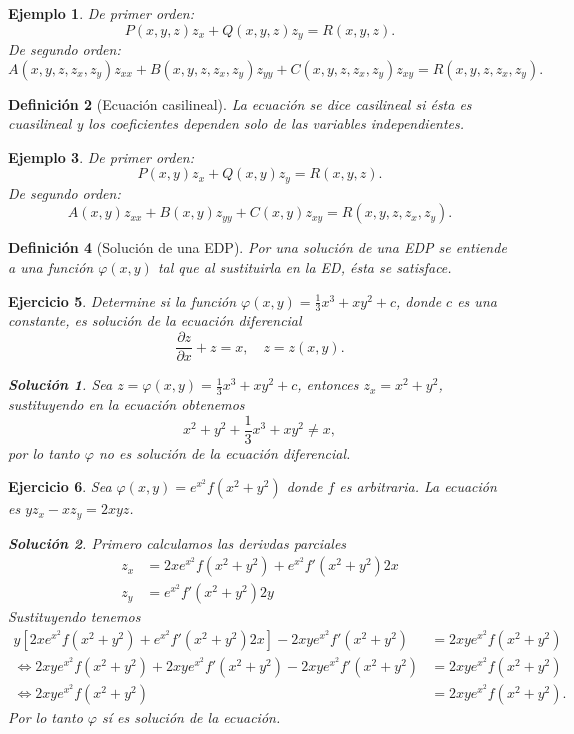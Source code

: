 \documentclass[11pt,letterpaper]{report}
\newtheorem{defn}{Definición}[chapter]
\newtheorem{example}[defn]{Ejemplo}
\newtheorem{exe}[defn]{Ejercicio}
\newtheorem*{sol}{Solución}
\newcommand\<{\langle}
\renewcommand\>{\rangle}
\renewcommand\phi\varphi
\begin{document}
\begin{example}
  De primer orden:
  \[
    P(x,y,z)z_x + Q(x,y,z) z_y = R(x,y,z).
  \] 
  De segundo orden:
  \[
    A(x,y,z,z_x,z_y) z_{xx} + B(x,y,z,z_x,z_y) z_{yy} +
    C(x,y,z,z_x,z_y) z_{xy} = R(x,y,z,z_x,z_y).
  \] 
\end{example}

\begin{defn}[Ecuación casilineal]
  La ecuación se dice casilineal si ésta es cuasilineal y
  los coeficientes dependen solo de las variables
  independientes.
\end{defn}

\begin{example}
  De primer orden:
  \[
    P(x,y)z_x + Q(x,y) z_y = R(x,y,z).
  \] 
  De segundo orden:
  \[
    A(x,y) z_{xx} + B(x,y) z_{yy} +
    C(x,y) z_{xy} = R(x,y,z,z_x,z_y).
  \] 

\end{example}

\begin{defn}[Solución de una EDP]
  Por una solución de una EDP se entiende a una función
  $\phi(x,y)$ tal que al sustituirla en la ED, ésta se
  satisface.
\end{defn}

\begin{exe}
  Determine si la función $\displaystyle \phi(x,y) =
  \frac{1}{3}x^3 + xy^2 + c$, donde $c$ es una constante, es
  solución de la ecuación diferencial
  \[
    \frac{\partial z}{\partial x} + z = x, \quad z = z(x,y).
  \] 

  \begin{sol}
    Sea $z = \phi(x,y) = \frac{1}{3}x^3 + xy^2 + c$,
    entonces $z_x = x^2 + y^2$, sustituyendo en la ecuación
    obtenemos
    \[
    x^2 + y^2 + \frac{1}{3}x^3 + xy^2 \neq x,
    \] por lo tanto $\phi$ no es solución de la ecuación
    diferencial.
  \end{sol}
\end{exe}

\begin{exe}
  Sea $\phi(x,y) = e^{x^2}f(x^2+y^2)$ donde $f$ es
  arbitraria. La ecuación es $y z_x - x z_y = 2xyz$.
  
  \begin{sol}
    Primero calculamos las derivdas parciales
    \begin{align*}
      z_x &= 2x e^{x^2} f(x^2 + y^2) + e^{x^2} f'(x^2
      +y^2)2x\\
      z_y &= e^{x^2} f'(x^2+y^2)2y
    \end{align*} 
    Sustituyendo tenemos
    \begin{align*}
      y\left[2x e^{x^2} f(x^2+y^2) + e^{x^2} f'(x^2+y^2)
      2x\right] - 2xy e^{x^2} f'(x^2+y^2) &= 2xy e^{x^2}
      f(x^2+y^2)\\
      \iff 2xy e^{x^2} f(x^2+y^2) + 2xy e^{x^2} f'(x^2+y^2) - 2xy
      e^{x^2} f'(x^2+y^2) &= 2xy e^{x^2} f(x^2+y^2)\\
      \iff 2xy e^{x^2} f(x^2+y^2) &= 2xy e^{x^2} f(x^2+y^2).
    \end{align*} Por lo tanto $\phi$ sí es solución de la
    ecuación.
  \end{sol}
\end{exe}
\end{document}
